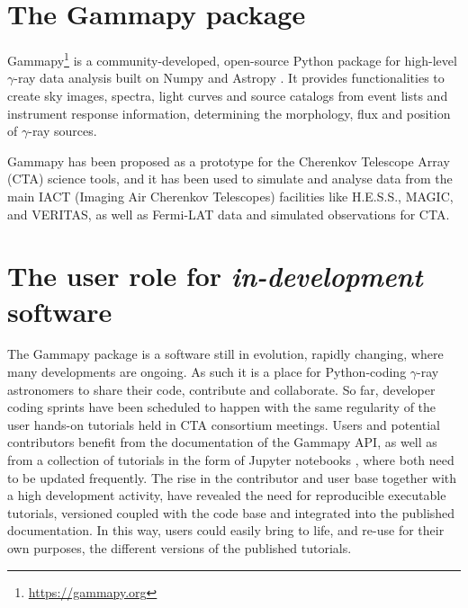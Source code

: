 \documentclass[11pt,twoside]{article}
\begin{document}
\section{The Gammapy package}

Gammapy\footnote{\url{https://gammapy.org}} \citep{2017ascl.soft11014D} is a community-developed, open-source Python package for high-level $\gamma$-ray data analysis built on Numpy \citep{oliphant_guide_2006} and Astropy \citep{2013ascl.soft04002G}. It provides functionalities to create sky images, spectra, light curves and source catalogs from event lists and instrument response information, determining the morphology, flux and position of $\gamma$-ray sources. 

Gammapy has been proposed as a prototype for the Cherenkov Telescope Array (CTA) science tools, and it has been used to simulate and analyse data from the main IACT (Imaging Air Cherenkov Telescopes) facilities like H.E.S.S., MAGIC, and VERITAS, as well as Fermi-LAT data and simulated observations for CTA.  

\section{The user role for \textit{in-development} software}

The Gammapy package is a software still in evolution, rapidly changing, where many developments are ongoing. As such it is a place for Python-coding $\gamma$-ray astronomers to share their code, contribute and collaborate. So far, developer coding sprints have been scheduled to happen with the same regularity of the user hands-on tutorials held in CTA consortium meetings. Users and potential contributors benefit from the documentation of the Gammapy API, as well as from a collection of tutorials in the form of Jupyter notebooks \citep{Kluyver:2016aa}, where both need to be updated frequently. The rise in the contributor and user base together with a high development activity, have revealed the need for reproducible executable tutorials, versioned coupled with the code base and integrated into the published documentation. In this way, users could easily bring to life, and re-use for their own purposes, the different versions of the published tutorials. 

\end{document}
